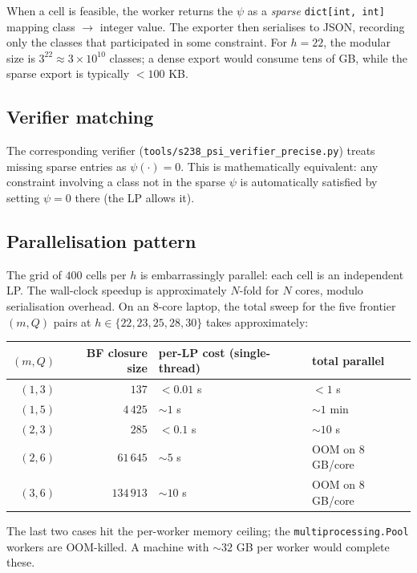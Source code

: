 \documentclass[11pt,a4paper]{article}
\theoremstyle{plain}
\theoremstyle{definition}
\begin{document}
When a cell is feasible, the worker returns the $\psi$ as a
\emph{sparse} \texttt{dict[int, int]} mapping class
$\to$ integer value. The exporter then serialises to JSON,
recording only the classes that participated in some constraint.
For $h = 22$, the modular size is $3^{22} \approx 3 \times 10^{10}$
classes; a dense export would consume tens of GB, while the
sparse export is typically $< 100$ KB.

\subsection*{Verifier matching}

The corresponding verifier
(\texttt{tools/s238\_psi\_verifier\_precise.py}) treats missing
sparse entries as $\psi(\cdot) = 0$. This is mathematically
equivalent: any constraint involving a class not in the sparse
$\psi$ is automatically satisfied by setting $\psi = 0$ there
(the LP allows it).

\subsection*{Parallelisation pattern}

The grid of $400$ cells per $h$ is embarrassingly parallel: each
cell is an independent LP. The wall-clock speedup is approximately
$N$-fold for $N$ cores, modulo serialisation overhead. On an
$8$-core laptop, the total sweep for the five frontier $(m, Q)$
pairs at $h \in \{22, 23, 25, 28, 30\}$ takes approximately:
\begin{center}\small
\begin{tabular}{rrll}
\toprule
$(m, Q)$ & BF closure size & per-LP cost (single-thread) & total parallel \\
\midrule
$(1, 3)$ & $137$    & $< 0.01$ s & $< 1$ s \\
$(1, 5)$ & $4\,425$ & $\sim 1$ s & $\sim 1$ min \\
$(2, 3)$ & $285$    & $< 0.1$ s  & $\sim 10$ s \\
$(2, 6)$ & $61\,645$ & $\sim 5$ s & OOM on $8$ GB/core \\
$(3, 6)$ & $134\,913$ & $\sim 10$ s & OOM on $8$ GB/core \\
\bottomrule
\end{tabular}
\end{center}
The last two cases hit the per-worker memory ceiling; the
\texttt{multiprocessing.Pool} workers are OOM-killed. A
machine with $\sim 32$ GB per worker would complete these.
\end{document}
